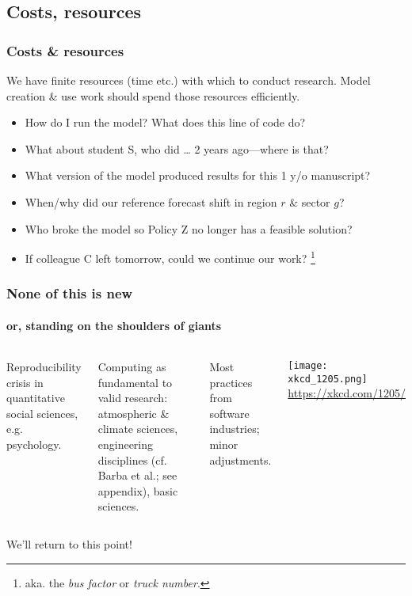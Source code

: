 \documentclass[12pt,aspectratio=169]{beamer}
\begin{document}
\subsection{Costs, resources}
\begin{frame}
\frametitle{Costs \& resources}

We have finite resources (time etc.) with which to conduct research.
Model creation \& use work should spend those resources efficiently.

\smallskip
{}
\begin{itemize}
  \item How do I run the model? What does this line of code do?
  \item What about student S, who did … 2 years ago—where is that?
  \item What version of the model produced results for this 1 y/o manuscript?
\end{itemize}

\begin{itemize}
  \item When/why did our reference forecast shift in region $r$ \& sector $g$?
  \item Who broke the model so Policy Z no longer has a feasible solution?
\end{itemize}

\begin{itemize}
  \item If colleague C left tomorrow, could we continue our work?%
  \footnote{aka. the \emph{bus factor} or \emph{truck number}.}
\end{itemize}

\end{frame}


\begin{frame}
\frametitle{None of this is new}
\framesubtitle{or, standing on the shoulders of giants}

\begin{columns}[T]
\column{0.35\paperwidth}
Reproducibility crisis in quantitative social sciences, e.g. psychology.

\bigskip
Computing as fundamental to valid research: atmospheric \& climate sciences, engineering disciplines (cf. Barba et al.; see appendix), basic sciences.

\bigskip
Most practices from software industries; minor adjustments.

\column{0.55\paperwidth}
\centering
\texttt{[image: xkcd\_1205.png]}
\url{https://xkcd.com/1205/}

\end{columns}

We'll return to this point!

\end{frame}
\end{document}
